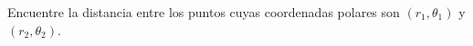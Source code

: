 \item Encuentre la distancia entre los puntos cuyas coordenadas polares son $(r_1, \theta_1)$ y $(r_2, \theta_2)$.
